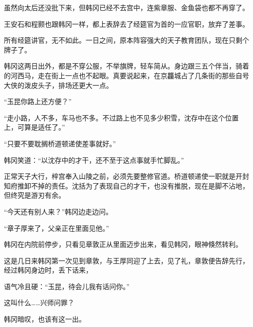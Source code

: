 虽然向太后还没批下来，但韩冈已经不去宫中，连紫章服、金鱼袋也都不再穿了。

王安石和程颢也跟韩冈一样，都上表辞去了经筵官为首的一应官职，放弃了差事。

所有经筵讲官，无不如此。一日之间，原本阵容强大的天子教育团队，现在只剩个牌子了。

韩冈这两日出外，都是不穿公服，不举旗牌，轻车简从。身边跟三五个伴当，骑着的河西马，走在街上一点也不起眼。真要说起来，在京龘城占了几条街的那些自号大侠的泼皮头子，排场还更大一点。

“玉昆你路上还方便？”

“走小路，人不多，车马也不多。不过路上也不见多少积雪，沈存中在这个位置上，可算是适任了。”

“只要不要耽搁桥道顿递使差事就好。”

韩冈笑道：“以沈存中的才干，还不至于这点事就手忙脚乱。”

正常天子大行，梓宫奉入山陵之前，必须先要整修官道。桥道顿递使一职就是开封知府推卸不掉的责任。沈括为了表现自己的才干，也没有推脱，现在是脚不沾地，但终究是游刃有余。

“今天还有别人来？”韩冈边走边问。

“章子厚来了，父亲正在里面见他。”

韩冈在内院前停步，只看见章敦正从里面迈步出来，看见韩冈，眼神倏然转利。

这是几日来韩冈第一次见到章敦，与王厚同迎了上去，见了礼，章敦便告辞先行，经过韩冈身边时，丢下话来，

语气冷且硬：“玉昆，待会儿我有话问你。”

这叫什么……兴师问罪？

韩冈暗叹，也该有这一出。
